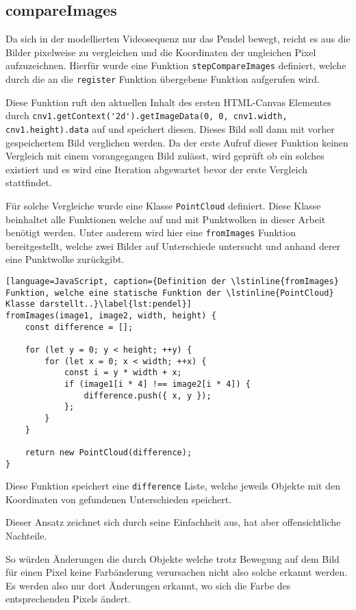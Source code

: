 \subsection{compareImages}

Da sich in der modellierten Videosequenz nur das Pendel bewegt, reicht es aus die Bilder pixelweise zu vergleichen und die Koordinaten der ungleichen Pixel aufzuzeichnen.
Hierfür wurde eine Funktion \lstinline{stepCompareImages} definiert, welche durch die an die \lstinline{register} Funktion übergebene Funktion aufgerufen wird.

Diese Funktion ruft den aktuellen Inhalt des ersten HTML-Canvas Elementes durch \lstinline{cnv1.getContext('2d').getImageData(0, 0, cnv1.width, cnv1.height).data} auf und speichert diesen.
Dieses Bild soll dann mit vorher gespeichertem Bild verglichen werden.
Da der erste Aufruf dieser Funktion keinen Vergleich mit einem vorangegangen Bild zulässt, wird geprüft ob ein solches existiert und es wird eine Iteration abgewartet bevor der erste Vergleich stattfindet.

Für solche Vergleiche wurde eine Klasse \lstinline{PointCloud} definiert.
Diese Klasse beinhaltet alle Funktionen welche auf und mit Punktwolken in dieser Arbeit benötigt werden.
Unter anderem wird hier eine \lstinline{fromImages} Funktion bereitgestellt, welche zwei Bilder auf Unterschiede untersucht und anhand derer eine Punktwolke zurückgibt.

\begin{lstlisting}[language=JavaScript, caption={Definition der \lstinline{fromImages} Funktion, welche eine statische Funktion der \lstinline{PointCloud} Klasse darstellt..}\label{lst:pendel}]
fromImages(image1, image2, width, height) {
    const difference = [];

    for (let y = 0; y < height; ++y) {
        for (let x = 0; x < width; ++x) {
            const i = y * width + x;
            if (image1[i * 4] !== image2[i * 4]) {
                difference.push({ x, y });
            };
        }
    }

    return new PointCloud(difference);
}
\end{lstlisting}

Diese Funktion speichert eine \lstinline{difference} Liste, welche jeweils Objekte mit den Koordinaten von gefundenen Unterschieden speichert.

Dieser Ansatz zeichnet sich durch seine Einfachheit aus, hat aber offensichtliche Nachteile.

So würden Änderungen die durch Objekte welche trotz Bewegung auf dem Bild für einen Pixel keine Farbänderung verursachen nicht also solche erkannt werden.
Es werden also nur dort Änderungen erkannt, wo sich die Farbe des entsprechenden Pixels ändert.

